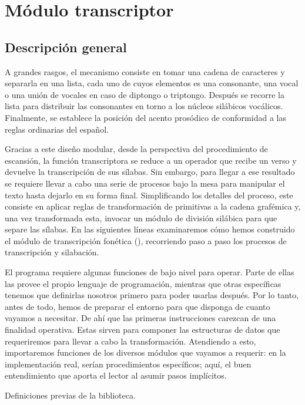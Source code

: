 \section{Módulo transcriptor}
\subsection{Descripción general}
A grandes rasgos, el mecanismo consiste en tomar una cadena de caracteres y separarla en una lista, cada uno de cuyos elementos es una consonante, una vocal o una unión de vocales en caso de diptongo o triptongo. Después se recorre la lista para distribuir las consonantes en torno a los núcleos silábicos vocálicos. Finalmente, se establece la posición del acento prosódico de conformidad a las reglas ordinarias del español.

Gracias a este diseño modular, desde la perspectiva del procedimiento de escansión, la función transcriptora se reduce a un operador que recibe un verso y devuelve la transcripción de sus sílabas. Sin embargo, para llegar a ese resultado se requiere llevar a cabo una serie de procesos bajo la mesa para manipular el texto hasta dejarlo en su forma final. Simplificando los detalles del proceso, este consiste en aplicar reglas de transformación de primitivas a la cadena grafémica y, una vez transformada esta, invocar un módulo de división silábica para que separe las sílabas. En las siguientes líneas examinaremos cómo hemos construido el módulo de transcripción fonética (), recorriendo paso a paso los procesos de transcripción y silabación. 

El programa requiere algunas funciones de bajo nivel para operar. Parte de ellas las provee el propio lenguaje de programación, mientras que otras específicas tenemos que definirlas nosotros primero para poder usarlas después. Por lo tanto, antes de todo, hemos de preparar el entorno para que disponga de cuanto vayamos a necesitar. De ahí que las primeras instrucciones carezcan de una finalidad operativa. Estas sirven para componer las estructuras de datos que requeriremos para llevar a cabo la transformación. Atendiendo a esto, importaremos funciones de los diversos módulos que vayamos a requerir: en la implementación real, serían procedimientos específicos; aquí, el buen entendimiento que aporta el lector al asumir pasos implícitos.

\begin{algorithm}[!ht] %
	\caption{Definiciones previas de la biblioteca.}\label{list:importfon}
	\;
	\Fclase{\Valoresp{}}{
		\word \gets\ $\{\}$\;
		\slbs \gets\ $\{\}$\;
	}
\end{algorithm}


